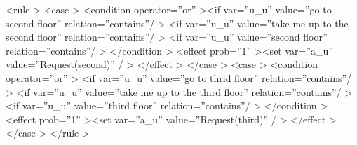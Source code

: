 \documentclass[a4paper, 12pt]{article}
\begin{document}
\textless rule \textgreater \newline
\indent \indent \textless  case \textgreater \newline
\indent \indent \indent \textless condition operator=”or”  \textgreater \newline\indent \indent \indent \indent \textless if var=”u\_u” value=”go to second floor” relation=”contains”/  \textgreater \newline
\indent \indent \indent \indent \textless if var=”u\_u” value=”take me up to the second floor” \newline
\indent \indent \indent \indent relation=”contains”/ \textgreater \newline
\indent  \indent \indent \indent \textless if var=”u\_u” value=”second floor” relation=”contains”/ \textgreater \newline
\indent \indent \indent \textless /condition \textgreater \newline
\indent \indent \indent \textless effect prob=”1” \textgreater \textless set var=”a\_u” value=”Request(second)” / \textgreater \newline
\indent \indent \indent \textless /effect \textgreater \newline
\indent \indent \textless /case \textgreater \newline
\indent \indent \textless case \textgreater \newline
\indent \indent \indent \textless condition operator=”or” \textgreater \newline
\indent \indent \indent \indent \textless if var=”u\_u” value=”go to thrid floor” relation=”contains”/ \textgreater \newline
\indent \indent \indent \indent \textless if var=”u\_u” value=”take me up to the third floor” relation=”contains”/ \textgreater \newline
\indent \indent \indent \indent \textless if var=”u\_u” value=”third floor” relation=”contains”/ \textgreater \newline
 \indent \indent \indent \textless /condition \textgreater \newline
\indent \indent  \textless effect prob=”1” \textgreater \textless set var=”a\_u” value=”Request(third)” / \textgreater \newline
\indent \indent  \textless /effect \textgreater \newline
\indent \indent \textless /case \textgreater \newline
\indent \textless /rule \textgreater \newline
\end{document}
